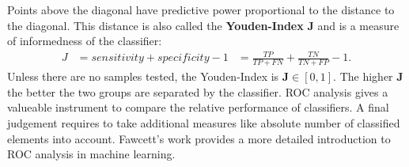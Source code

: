 Points above the diagonal have predictive power proportional to the distance to the diagonal.
This distance is also called the \textbf{Youden-Index} $\mathbf{J}$\cite{youden_cancer1950} and is a measure of informedness of the classifier:
\begin{equation}
\begin{aligned}
    J &= sensitivity + specificity - 1
      &= \frac{TP}{TP + FN} + \frac{TN}{TN + FP} - 1\text{.}
\end{aligned}
\label{eq:youden}
\end{equation}
Unless there are no samples tested, the Youden-Index is $\mathbf{J} \in [0, 1]$.
The higher $\mathbf{J}$ the better the two groups are separated by the classifier.
\acrshort{ROC} analysis gives a valueable instrument to compare the relative performance of classifiers.
A final judgement requires to take additional measures like absolute number of classified elements into account.
Fawcett's\cite{fawcett_2006} work provides a more detailed introduction to \acrshort{ROC} analysis in machine learning.
